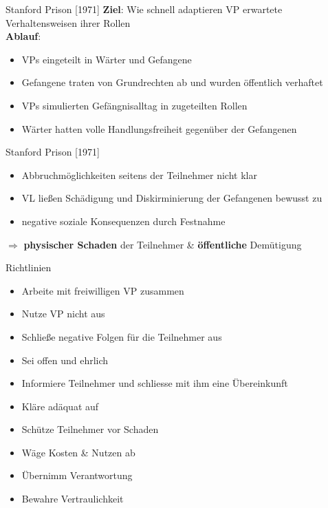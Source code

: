 \documentclass[10pt]{beamer}
\begin{document}
	\begin{frame}{Stanford Prison [1971]}
		\textbf{Ziel}: Wie schnell adaptieren VP erwartete Verhaltensweisen ihrer Rollen \\
		
		\textbf{Ablauf}:
		\begin{itemize}
			\item VPs eingeteilt in Wärter und Gefangene
			\item Gefangene traten von Grundrechten ab und wurden öffentlich verhaftet
			\item VPs simulierten Gefängnisalltag in zugeteilten Rollen
			\item Wärter hatten volle Handlungsfreiheit gegenüber der Gefangenen
		\end{itemize}
		
	\end{frame}	
	
	\begin{frame}{Stanford Prison [1971]}
		\begin{itemize}
			\item Abbruchmöglichkeiten seitens der Teilnehmer nicht klar
			\item VL ließen Schädigung und Diskirminierung der Gefangenen bewusst zu
			\item negative soziale Konsequenzen durch Festnahme
		\end{itemize}
		$\Rightarrow$ \textbf{physischer Schaden} der Teilnehmer \& \textbf{öffentliche} Demütigung
	\end{frame}	
	
	\begin{frame}{Richtlinien}
		
		\begin{itemize}
			\item Arbeite mit freiwilligen VP zusammen
			\item Nutze VP nicht aus
			\item Schließe negative Folgen für die Teilnehmer aus
			\item Sei offen und ehrlich
			\item Informiere Teilnehmer und schliesse mit ihm eine Übereinkunft
			\item Kläre adäquat auf
			\item Schütze Teilnehmer vor Schaden
			\item Wäge Kosten \& Nutzen ab
			\item Übernimm Verantwortung
			\item Bewahre Vertraulichkeit
		\end{itemize}
		
	\end{frame}
	
\end{document}
